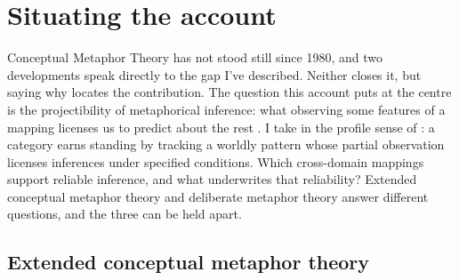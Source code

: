 
\section{Situating the account}
\label{sec:situating}

Conceptual Metaphor Theory has not stood still since 1980, and two developments speak directly to the gap I've described. Neither closes it, but saying why locates the contribution. The question this account puts at the centre is the projectibility of metaphorical inference: what observing some features of a mapping licenses us to predict about the rest \citep{Goodman1955}. I take  in the profile sense of \textcite{reynolds2026kindsProjectibilityProfiles}: a category earns standing by tracking a worldly pattern whose partial observation licenses inferences under specified conditions. Which cross-domain mappings support reliable inference, and what underwrites that reliability? Extended conceptual metaphor theory and deliberate metaphor theory answer different questions, and the three can be held apart.

\subsection{Extended conceptual metaphor theory}

